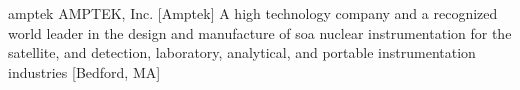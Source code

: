 \newglsXcompany%
{amptek}%
{AMPTEK\textsuperscript{\textregistered}, Inc.}%
[Amptek]%
{A high technology company and a recognized world leader in the design and manufacture of \gls{soa} nuclear instrumentation for the satellite,  and  detection, laboratory, analytical, and portable instrumentation industries \cite{website:Amptek}}%
[Bedford, MA]%